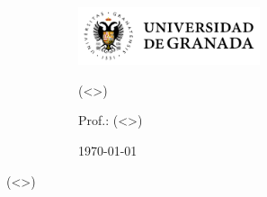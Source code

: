 \documentclass{article}
\begin{document}

	\begin{figure}[h]
		\begin{subfigure}{0.5\linewidth}
		\includegraphics[height=1.7cm]{ugr.png}
		\end{subfigure}
		\begin{subfigure}{0.5\linewidth}

		\small
		\hfill (<>)

		\hfill Prof.: (<>)

		\hfill \today
		\end{subfigure}
	\end{figure}

(<>)
\end{document}
